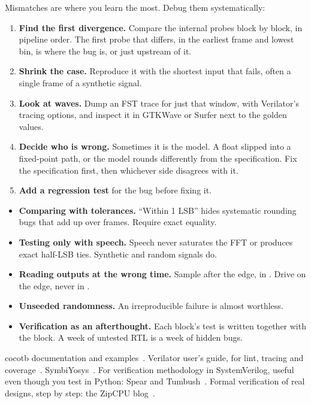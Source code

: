 Mismatches are where you learn the most. Debug them systematically:
\begin{enumerate}
  \item \textbf{Find the first divergence.} Compare the internal probes block
        by block, in pipeline order. The first probe that differs, in the
        earliest frame and lowest bin, is where the bug is, or just upstream
        of it.
  \item \textbf{Shrink the case.} Reproduce it with the shortest input that
        fails, often a single frame of a synthetic signal.
  \item \textbf{Look at waves.} Dump an FST trace for just that window, with
        Verilator's tracing options, and inspect it in GTKWave or Surfer next to
        the golden values.
  \item \textbf{Decide who is wrong.} Sometimes it is the model. A float slipped
        into a fixed-point path, or the model rounds differently from the
        specification. Fix the specification first, then whichever side
        disagrees with it.
  \item \textbf{Add a regression test} for the bug before fixing it.
\end{enumerate}

\begin{pitfallbox}
\begin{itemize}
  \item \textbf{Comparing with tolerances.} \enquote{Within 1 LSB} hides
        systematic rounding bugs that add up over frames. Require exact
        equality.
  \item \textbf{Testing only with speech.} Speech never saturates the FFT or
        produces exact half-LSB ties. Synthetic and random signals do.
  \item \textbf{Reading outputs at the wrong time.} Sample after the edge, in
        . Drive on the edge, never in .
  \item \textbf{Unseeded randomness.} An irreproducible failure is almost
        worthless.
  \item \textbf{Verification as an afterthought.} Each block's test is written
        together with the block. A week of untested RTL is a week of hidden
        bugs.
\end{itemize}
\end{pitfallbox}

\begin{readbox}
cocotb documentation and examples~\cite{ch12-13:cocotbdocs}. Verilator user's
guide, for lint, tracing and coverage~\cite{ch12-13:verilatorguide}.
SymbiYosys~\cite{ch12-13:sbydocs}. For verification methodology in
SystemVerilog, useful even though you test in Python:
Spear and Tumbush~\cite{ch12-13:spear2012svverif}. Formal verification of real
designs, step by step: the ZipCPU blog~\cite{ch12-13:zipcpu}.
\end{readbox}


